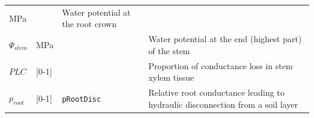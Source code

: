 \documentclass[]{book}
\begin{document}
\begin{longtable}[]{@{}llll@{}}
\begin{minipage}[t]{0.10\columnwidth}
MPa\strut
\end{minipage} & \begin{minipage}[t]{0.12\columnwidth}\raggedright\strut
\strut
\end{minipage} & \begin{minipage}[t]{0.45\columnwidth}\raggedright\strut
Water potential at the root crown\strut
\end{minipage}\tabularnewline
\begin{minipage}[t]{0.11\columnwidth}\raggedright\strut
\(\Psi_{stem}\)\strut
\end{minipage} & \begin{minipage}[t]{0.10\columnwidth}\raggedright\strut
MPa\strut
\end{minipage} & \begin{minipage}[t]{0.12\columnwidth}\raggedright\strut
\strut
\end{minipage} & \begin{minipage}[t]{0.45\columnwidth}\raggedright\strut
Water potential at the end (highest part) of the stem\strut
\end{minipage}\tabularnewline
\begin{minipage}[t]{0.11\columnwidth}\raggedright\strut
\(PLC\)\strut
\end{minipage} & \begin{minipage}[t]{0.10\columnwidth}\raggedright\strut
{[}0-1{]}\strut
\end{minipage} & \begin{minipage}[t]{0.12\columnwidth}\raggedright\strut
\strut
\end{minipage} & \begin{minipage}[t]{0.45\columnwidth}\raggedright\strut
Proportion of conductance loss in stem xylem tissue\strut
\end{minipage}\tabularnewline
\begin{minipage}[t]{0.11\columnwidth}\raggedright\strut
\(p_{root}\)\strut
\end{minipage} & \begin{minipage}[t]{0.10\columnwidth}\raggedright\strut
{[}0-1{]}\strut
\end{minipage} & \begin{minipage}[t]{0.12\columnwidth}\raggedright\strut
\texttt{pRootDisc}\strut
\end{minipage} & \begin{minipage}[t]{0.45\columnwidth}\raggedright\strut
Relative root conductance leading to hydraulic disconnection from a soil
layer\strut
\end{minipage}\tabularnewline
\bottomrule
\end{longtable}
\end{document}
